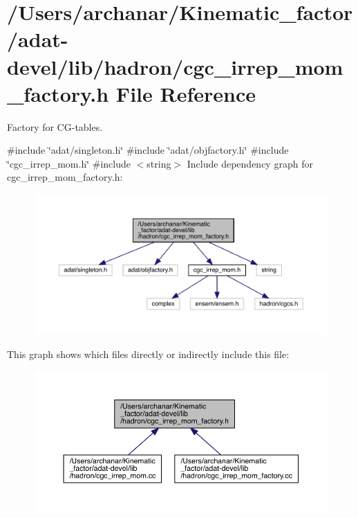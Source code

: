 \hypertarget{adat-devel_2lib_2hadron_2cgc__irrep__mom__factory_8h}{}\section{/\+Users/archanar/\+Kinematic\+\_\+factor/adat-\/devel/lib/hadron/cgc\+\_\+irrep\+\_\+mom\+\_\+factory.h File Reference}
\label{adat-devel_2lib_2hadron_2cgc__irrep__mom__factory_8h}


Factory for C\+G-\/tables.  


{\ttfamily \#include \char`\"{}adat/singleton.\+h\char`\"{}}\newline
{\ttfamily \#include \char`\"{}adat/objfactory.\+h\char`\"{}}\newline
{\ttfamily \#include \char`\"{}cgc\+\_\+irrep\+\_\+mom.\+h\char`\"{}}\newline
{\ttfamily \#include $<$string$>$}\newline
Include dependency graph for cgc\+\_\+irrep\+\_\+mom\+\_\+factory.\+h\+:
\nopagebreak
\begin{figure}[H]
\begin{center}
\leavevmode
\includegraphics[width=350pt]{dd/d86/adat-devel_2lib_2hadron_2cgc__irrep__mom__factory_8h__incl}
\end{center}
\end{figure}
This graph shows which files directly or indirectly include this file\+:
\nopagebreak
\begin{figure}[H]
\begin{center}
\leavevmode
\includegraphics[width=350pt]{dd/d24/adat-devel_2lib_2hadron_2cgc__irrep__mom__factory_8h__dep__incl}
\end{center}
\end{figure}
